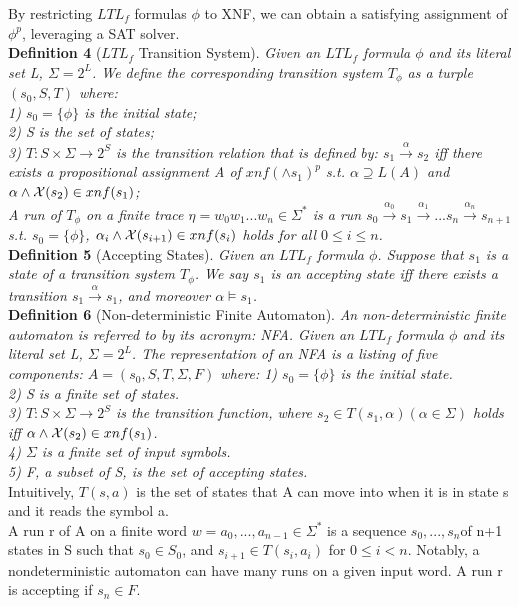 By restricting $LTL_f$ formulas $\phi$ to XNF, we can obtain a satisfying assignment of $\phi^{p}$, leveraging a SAT solver.\\
{\bf Definition 4} ($LTL_f$ Transition System). {\it Given an $LTL_f$ formula $\phi$ and its literal set L, $\Sigma = 2^{L}$. We define the corresponding transition system $T_{\phi}$ as a turple $(s_0,S, T)$ where: \\
1) $s_0 = \{\phi\}$ is the initial state; \\
2) S is the set of states;\\
3) $T : S \times \Sigma \to 2^S$ is the transition relation that is defined by: $s_1\overset{\alpha}{\rightarrow} s_2$  iff there exists a propositional assignment A of $xnf(\wedge s_1)^p$ s.t. $\alpha \supseteq L(A)$ and $ \alpha \wedge \mathcal{X}(s_2) \in xnf(s_1)$; \\
A run of $T_{\phi}$ on a finite trace $\eta = w_0w_1...w_n \in \Sigma^{*}$ is a run $s_0 \overset{\alpha_0}{\rightarrow} s_1 \overset{\alpha_1}{\rightarrow} ... s_n \overset{\alpha_n}{\rightarrow} s_{n+1} $ s.t. $s_0 = \{\phi\}$,  $\alpha_i \wedge \mathcal{X}(s_{i+1}) \in xnf(s_i)$ holds for all $0 \leq i \leq n$.
\\}
{\bf Definition 5} (Accepting States). {\it Given an $LTL_f$ formula $\phi$. Suppose that $s_1$ is a state of a transition system $T_{\phi}$. We say  $s_1$ is an accepting state iff there exists a transition $ s_1 \overset{\alpha}{\rightarrow}s_1$, and moreover $\alpha \models s_1$. }   \\   
{\bf Definition 6} (Non-deterministic Finite Automaton). {\it An non-deterministic finite automaton is referred to by its acronym: NFA. Given an $LTL_f$ formula $\phi$ and its literal set L, $\Sigma = 2^{L}$. The representation of an NFA is a listing of five components: $A = (s_0,S, T, \Sigma, F)$ where:
1) $s_0 = \{\phi \}$ is the initial state.\\
2) S is a finite set of states.\\
3) $T:  S \times \Sigma \to 2^S$ is the transition function, where $s_2 \in T(s_1, \alpha) (\alpha \in \Sigma)$ holds iff $ \alpha \wedge \mathcal{X}(s_2) \in xnf(s_1)$.\\
4) $\Sigma$ is a finite set of input symbols.\\
5) F, a subset of S, is the set of accepting states.\\ }
Intuitively, $T(s, a)$ is the set of states that A can move into when it is in state s and it reads the symbol a.  \\
A run r of A on a finite word $w = a_0, ..., a_{n-1} \in \Sigma^{*}$ is a sequence $s_0, ..., s_n $of n+1 states in S such that $s_0 \in S_0$, and $s_{i+1} \in T(s_i, a_i)$ for $0 \leq i < n$. Notably, a nondeterministic automaton can have many runs on a given input word. A run r is accepting if $s_n \in F$.   

